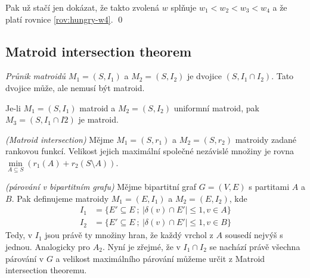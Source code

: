 Pak už stačí jen dokázat, že takto zvolená $w$ splňuje $w_1 < w_2 < w_3 < w_4$ a
že platí rovnice \ref{rov:hungry-w4}.
\qed

\subsection{Matroid intersection theorem}
\df \emph{Průnik matroidů} $M_1 = (S,I_1)$ a $M_2 = (S,I_2)$ je dvojice
$(S,I_1\cap I_2)$. Tato dvojice může, ale nemusí být matroid.

\tv Je-li $M_1 = (S,I_1)$ matroid a $M_2 = (S,I_2)$ uniformní matroid, pak $M_3
= (S,I_1\cap I2)$ je matroid.

\vt \emph{(Matroid intersection)} Mějme $M_1 = (S,r_1)$ a $M_2 = (S,r_2)$
matroidy zadané rankovou funkcí. Velikost jejich maximální společné nezávislé
množiny je rovna
$\min\limits_{A\subseteq S} \left(r_1(A) + r_2(S\setminus A)\right)$.

\app \emph{(párování v bipartitním grafu)} Mějme bipartitní graf $G = (V,E)$ s
partitami $A$ a $B$. Pak definujeme matroidy $M_1 = (E,I_1)$ a $M_2 = (E,I_2)$,
kde
\begin{align*}
I_1 &= \{E'\subseteq E ~;~ |\delta(v)\cap E'| \le 1, v\in A\} \\
I_2 &= \{E'\subseteq E ~;~ |\delta(v)\cap E'| \le 1, v\in B\}
\end{align*}
Tedy, v $I_1$ jsou právě ty množiny hran, že každý vrchol z $A$ sousedí nejvýš s
jednou. Analogicky pro $A_2$. Nyní je zřejmé, že v $I_1\cap I_2$ se nachází
právě všechna párování v $G$ a velikost maximálního párování můžeme určit z
Matroid intersection theoremu.

